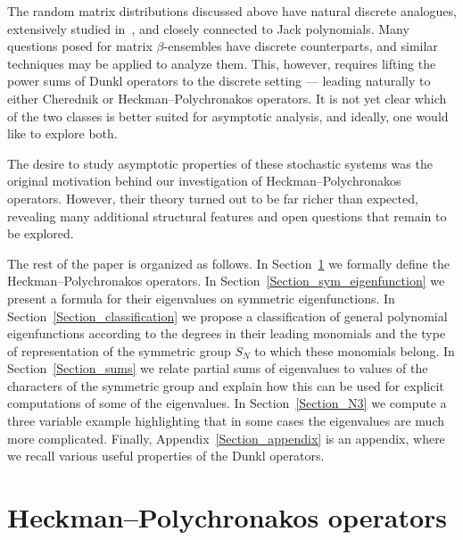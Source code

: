 The random matrix distributions discussed above have natural discrete analogues, extensively studied in~\cite{kerov2000anisotropic, borodin2005z, gorin2015multilevel,dolega2016gaussian,borodin2017gaussian, dolega2019gaussian, guionnet2019rigidity,huang2021law,dimitrov2022asymptotics,cuenca2023universality,moll2023gaussian, dimitrov2024global,gorin2024dynamical}, and closely connected to Jack polynomials. Many questions posed for matrix $\beta$-ensembles have discrete counterparts, and similar techniques may be applied to analyze them. This, however, requires lifting the power sums of Dunkl operators to the discrete setting --- leading naturally to either Cherednik or Heckman--Polychronakos operators. It is not yet clear which of the two classes is better suited for asymptotic analysis, and ideally, one would like to explore both.

The desire to study asymptotic properties of these stochastic systems was the original motivation behind our investigation of Heckman--Polychronakos operators. However, their theory turned out to be far richer than expected, revealing many additional structural features and open questions that remain to be explored.

The rest of the paper is organized as follows. In Section~\ref{Section_HP_operators} we formally define the Heckman--Polychronakos operators. In Section~\ref{Section_sym_eigenfunction} we present a formula for their eigenvalues on symmetric eigenfunctions. In Section~\ref{Section_classification} we propose a classification of general polynomial eigenfunctions according to the degrees in their leading monomials and the type of representation of the symmetric group $S_N$ to which these monomials belong. In Section~\ref{Section_sums} we relate partial sums of eigenvalues to values of the characters of the symmetric group and explain how this can be used for explicit computations of some of the eigenvalues. In Section~\ref{Section_N3} we compute a three variable example highlighting that in some cases the eigenvalues are much more complicated. Finally, Appendix~\ref{Section_appendix} is an appendix, where we recall various useful properties of the Dunkl operators.


\section{Heckman--Polychronakos operators}

\label{Section_HP_operators}


